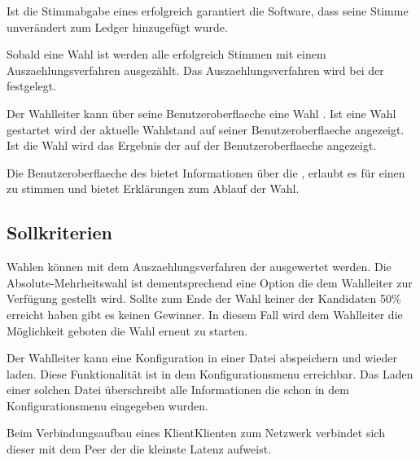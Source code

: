 \documentclass[parskip=full,11pt,twoside]{scrartcl}
\begin{document}
Ist die \gls{Stimmabgabe} eines  erfolgreich garantiert die Software, dass seine \gls{Stimme} unverändert zum \gls{Ledger} hinzugefügt wurde.

Sobald eine \gls{Wahl}  ist werden alle erfolgreich  Stimmen mit einem \gls{Auszaehlungsverfahren} ausgezählt. Das \gls{Auszaehlungsverfahren} wird bei der  festgelegt.

Der \gls{Wahlleiter} kann über seine \gls{Benutzeroberflaeche} eine Wahl . Ist eine \gls{Wahl} gestartet wird der aktuelle \gls{Wahlstand} auf seiner \gls{Benutzeroberflaeche} angezeigt. Ist die Wahl  wird das Ergebnis der  auf der \gls{Benutzeroberflaeche} angezeigt.

Die \gls{Benutzeroberflaeche} des  bietet Informationen über die , erlaubt es für einen  zu stimmen und bietet Erklärungen zum Ablauf der Wahl.

\subsection{Sollkriterien}

Wahlen können mit dem \gls{Auszaehlungsverfahren} der  ausgewertet werden. Die \gls{Absolute-Mehrheitswahl} ist dementsprechend eine Option die dem \gls{Wahlleiter} zur Verfügung gestellt wird.
Sollte zum Ende der Wahl keiner der Kandidaten 50\% erreicht haben gibt es keinen Gewinner.
In diesem Fall wird dem Wahlleiter die Möglichkeit geboten die Wahl erneut zu starten.

Der \gls{Wahlleiter} kann eine \gls{Konfiguration} in einer Datei abspeichern und wieder laden. Diese Funktionalität ist in dem \gls{Konfigurationsmenu} erreichbar. Das Laden einer solchen Datei überschreibt alle Informationen die schon in dem \gls{Konfigurationsmenu} eingegeben wurden.

Beim Verbindungsaufbau eines \gls{Klient}{Klienten} zum \gls{Netzwerk} verbindet sich dieser mit dem \gls{Peer} der die kleinste \gls{Latenz} aufweist.
\end{document}
